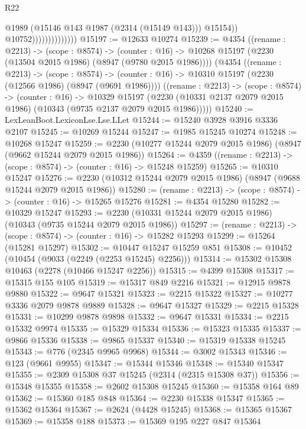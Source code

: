 \begin{lexlean}{R22}
\begin{coremodule}
                                    @1989
                                    (@15146 @143 @1987 (@2314 (@15149 @143)))
                                    @15154))
                                @10752))))))))))))))
@15197 := @12633 @10274
@15239 := @4354
    ((rename : @2213) ->
    (scope : @8574) ->
    (counter : @16) -> @10268 @15197 (@2230 (@13504 @2015 @1986) (@8947 (@9780 @2015 @1986))))
    (@4354
      ((rename : @2213) ->
      (scope : @8574) ->
      (counter : @16) -> @10310 @15197 (@2230 (@12566 @1986) (@8947 (@9691 @1986))))
      ((rename : @2213) ->
      (scope : @8574) ->
      (counter : @16) ->
      @10329
        @15197
        (@2230 (@10331 @2137 @2079 @2015 @1986) (@10343 (@9735 @2137 @2079 @2015 @1986)))))
@15240 := LexLeanBoot.LexiconLse.Lse.LLet
@15244 := @15240 @3928 @3916 @3336 @2107
@15245 := @10269 @15244
@15247 := @1985 @15245 @10274
@15248 := @10268 @15247
@15259 := @2230 (@10277 @15244 @2079 @2015 @1986) (@8947 (@9662 @15244 @2079 @2015 @1986))
@15264 := @4359 ((rename : @2213) -> (scope : @8574) -> (counter : @16) -> @15248 @15259)
@15265 := @10310 @15247
@15276 := @2230 (@10312 @15244 @2079 @2015 @1986) (@8947 (@9688 @15244 @2079 @2015 @1986))
@15280 := (rename : @2213) -> (scope : @8574) -> (counter : @16) -> @15265 @15276
@15281 := @4354 @15280
@15282 := @10329 @15247
@15293 := @2230 (@10331 @15244 @2079 @2015 @1986) (@10343 (@9735 @15244 @2079 @2015 @1986))
@15297 := (rename : @2213) -> (scope : @8574) -> (counter : @16) -> @15282 @15293
@15299 := @15264 (@15281 @15297)
@15302 := @10447 @15247 @15259 @851
@15308 := @10452 (@10454 (@9033 (@2249 (@2253 @15245) @2256)))
@15314 := @15302 @15308 @10463 (@2278 (@10466 @15247 @2256))
@15315 := @4399 @15308
@15317 := @15315 @155 @105
@15319 := @15317 @849 @2216
@15321 := @12915 @9878 @9880
@15322 := @9647 @15321
@15323 := @2215 @15322
@15327 := @10277 @3336 @2079 @9878 @9889
@15328 := @9647 @15327
@15329 := @2215 @15328
@15331 := @10299 @9878 @9898
@15332 := @9647 @15331
@15334 := @2215 @15332 @9974
@15335 := @15329 @15334
@15336 := @15323 @15335
@15337 := @9866 @15336
@15338 := @9865 @15337
@15340 := @15319 @15338 @15245
@15343 := @776 (@2345 @9965 @9968)
@15344 := @3002 @15343
@15346 := @123 (@9661 @9955)
@15347 := @15344 @15346
@15348 := @15340 @15347
@15355 := @2309 @15308 @37 @15245 (@2314 (@2315 @15308 @37))
@15356 := @15348 @15355
@15358 := @2602 @15308 @15245
@15360 := @15358 @164 @89
@15362 := @15360 @185 @848
@15364 := @2230 @15338 @15347
@15365 := @15362 @15364
@15367 := @2624 (@4428 @15245)
@15368 := @15365 @15367
@15369 := @15358 @188
@15373 := @15369 @195 @227 @847 @15364

\end{coremodule}
\end{lexlean}
